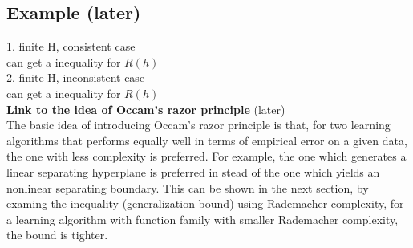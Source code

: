 \documentclass[12pt]{article}
\theoremstyle{definition}
\theoremstyle{remark}
\numberwithin{equation}{section}
\begin{document}
\subsection{Example (later)}
1. finite H, consistent case \\[0.2cm]
can get a inequality for $R(h)$\\[0.2cm]
2. finite H, inconsistent case \\[0.2cm]
can get a inequality for $R(h)$ \\[0.2cm]
\textbf{Link to the idea of Occam's razor principle} (later)\\[0.2cm]
The basic idea of introducing Occam's razor principle is that, for two learning algorithms that performs equally well in terms of empirical error on a given data, the one with less complexity is preferred. For example, the one which generates a linear separating hyperplane is preferred in stead of the one which yields an nonlinear separating boundary. This can be shown in the next section, by examing the inequality (generalization bound) using Rademacher complexity, for a learning algorithm with function family with smaller Rademacher complexity, the bound is tighter.
\end{document}
